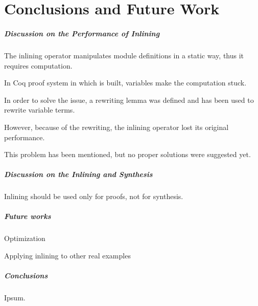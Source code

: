 \chapter{Conclusions and Future Work}
\label{chap:conclusions}

\paragraph{Discussion on the Performance of Inlining}

The inlining operator manipulates module definitions in a static way,
thus it requires computation.

In Coq proof system in which \Kami{} is built, variables make the
computation stuck.

In order to solve the issue, a rewriting lemma was defined and has
been used to rewrite variable terms.

However, because of the rewriting, the inlining operator lost its original
performance. 

This problem has been mentioned, but no proper solutions were
suggested yet.

\paragraph{Discussion on the Inlining and Synthesis}

Inlining should be used only for proofs, not for synthesis.

\paragraph{Future works}

Optimization

Applying inlining to other real examples

\paragraph{Conclusions}

Ipsum.
